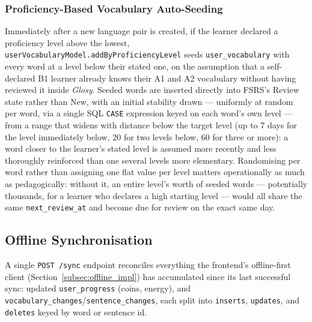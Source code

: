         \subsubsection{Proficiency-Based Vocabulary Auto-Seeding}
        \begin{sloppypar}
        Immediately after a new language pair is created, if the learner declared a proficiency level above the lowest, \texttt{userVocabularyModel.addByProficiencyLevel} seeds \texttt{user\_vocabulary} with every word at a level below their stated one, on the assumption that a self-declared B1 learner already knows their A1 and A2 vocabulary without having reviewed it inside \textit{Glosy}. Seeded words are inserted directly into FSRS's Review state rather than New, with an initial stability drawn --- uniformly at random per word, via a single SQL \texttt{CASE} expression keyed on each word's own level --- from a range that widens with distance below the target level (up to 7 days for the level immediately below, 20 for two levels below, 60 for three or more): a word closer to the learner's stated level is assumed more recently and less thoroughly reinforced than one several levels more elementary. Randomising per word rather than assigning one flat value per level matters operationally as much as pedagogically: without it, an entire level's worth of seeded words --- potentially thousands, for a learner who declares a high starting level --- would all share the same \texttt{next\_review\_at} and become due for review on the exact same day.
        \end{sloppypar}

    \subsection{Offline Synchronisation}
    \label{subsec:sync_impl}
    \begin{sloppypar}
    A single \texttt{POST /sync} endpoint reconciles everything the frontend's offline-first client (Section~\ref{subsec:offline_impl}) has accumulated since its last successful sync: updated \texttt{user\_progress} (coins, energy), and \texttt{vocabulary\_changes}/\texttt{sentence\_changes}, each split into \texttt{inserts}, \texttt{updates}, and \texttt{deletes} keyed by word or sentence id.
    \end{sloppypar}

